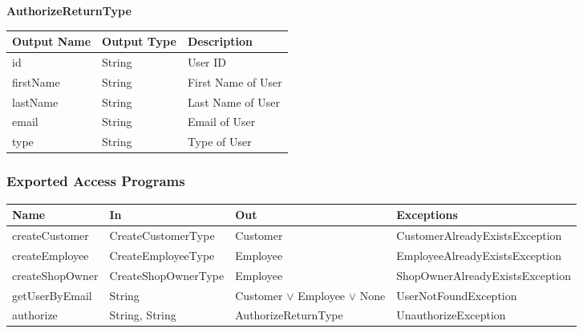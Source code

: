 \documentclass[12pt, titlepage]{article}
\begin{document}
\textbf{AuthorizeReturnType}

\begin{table}[H]
	\begin{tabular}{|l|l|l|}
		\hline
		\textbf{Output Name} & \textbf{Output Type} & \textbf{Description} \\
		\hline
		id                   & String               & User ID              \\
		\hline
		firstName            & String               & First Name of User   \\
		\hline
		lastName             & String               & Last Name of User    \\
		\hline
		email                & String               & Email of User        \\
		\hline
		type                 & String               & Type of User         \\
		\hline
	\end{tabular}
\end{table}

\subsubsection{Exported Access Programs}

\begin{center}
	\begin{adjustbox}{width=\textwidth}
		\begin{tabular}{llll}
			\hline
			\textbf{Name}   & \textbf{In}         & \textbf{Out}                         & \textbf{Exceptions}             \\
			\hline
			createCustomer  & CreateCustomerType  & Customer                             & CustomerAlreadyExistsException  \\
			createEmployee  & CreateEmployeeType  & Employee                             & EmployeeAlreadyExistsException  \\
			createShopOwner & CreateShopOwnerType & Employee                             & ShopOwnerAlreadyExistsException \\
			getUserByEmail  & String              & Customer $\lor$ Employee $\lor$ None & UserNotFoundException           \\
			authorize       & String, String      & AuthorizeReturnType                  & UnauthorizeException            \\
			\hline
		\end{tabular}
	\end{adjustbox}
\end{center}
\end{document}
